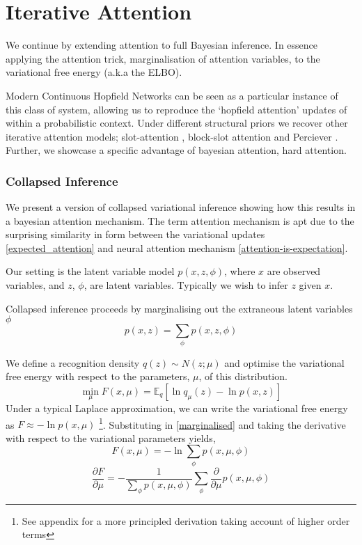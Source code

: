 \documentclass{article}
\theoremstyle{plain}
\theoremstyle{definition}
\theoremstyle{remark}
\begin{document}
\section{Iterative Attention}
We continue by extending attention to full Bayesian inference. In essence applying the attention trick, marginalisation of attention variables, to the variational free energy (a.k.a the ELBO).

Modern Continuous Hopfield Networks can be seen as a particular instance of this class of system, allowing us to reproduce the `hopfield attention' updates of \cite{ramsauer_hopfield_2021} within a probabilistic context. Under different structural priors we  recover other iterative attention models; slot-attention \cite{locatello_object-centric_2020}, block-slot attention \cite{singh_neural_2022} and Perciever \cite{jaegle_perceiver_2021}. Further, we showcase a specific advantage of bayesian attention, hard attention.



\subsubsection{Collapsed Inference}
We present a version of collapsed variational inference \cite{teh_collapsed_2006} showing how this results in a bayesian attention mechanism. The term attention mechanism is apt due to the surprising similarity in form between the variational updates \eqref{expected_attention} and neural attention mechanism \eqref{attention-is-expectation}. 

Our setting is the latent variable model $p(x,z, \phi)$, where $x$ are observed variables, and $z$, $\phi$, are latent variables. Typically  we wish to infer $z$ given $x$. 

Collapsed inference proceeds by marginalising out the extraneous latent variables $\phi$
\begin{equation}
    p(x, z) = \sum_{\phi} p(x,z, \phi) \label{marginalised}
\end{equation}

We define a recognition density $q(z) \sim N(z; \mu)$ and optimise the variational free energy with respect to the parameters, $\mu$, of this distribution.
$$\min_{\mu} F(x, \mu) = \mathbb{E}_q[\ln q_\mu(z) - \ln p(x,z)]$$
Under a typical  Laplace approximation, we can write the variational free energy as  $F \approx -\ln p(x, \mu)$ \footnote{See appendix for a more principled derivation taking account of higher order terms}.  Substituting in \eqref{marginalised} and taking the derivative with respect to the variational parameters yields,
$$F(x, \mu) = - \ln \sum_{\phi} p(x, \mu, \phi)$$
\begin{equation}
    \frac{\partial F}{\partial \mu} = - \frac{1}{\sum_{\phi} p(x, \mu, \phi)}\sum_{\phi} \frac{\partial}{\partial \mu}p(x, \mu, \phi) \label{general_attention}
\end{equation}
\end{document}
